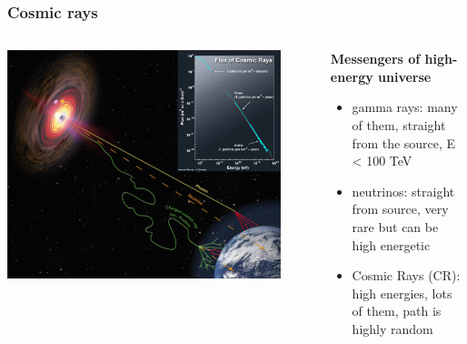 \documentclass[aspectratio=1610, 9pt]{beamer}
\begin{document}
\begin{frame}\frametitle{Cosmic rays}
  \begin{columns}
    \begin{column}[c]{0.48\textwidth}
      \includegraphics[width=0.9\textwidth]{CR_cta.png}
    \end{column}
    \begin{column}[c]{0.48\textwidth}
      \textbf{Messengers of high-energy universe}
      \begin{itemize}
        \item gamma rays: many of them, straight from the source, E < 100 TeV
        \item neutrinos: straight from source, very rare but can be high energetic
        \item Cosmic Rays (CR): high energies, lots of them, path is highly random
      \end{itemize}
    \end{column}
  \end{columns}
\end{frame}
\end{document}
